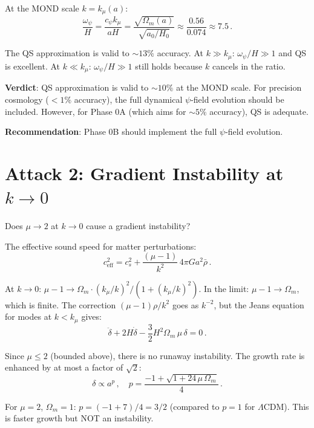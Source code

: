 \documentclass[11pt,a4paper]{article}
\begin{document}
At the MOND scale $k = k_\mu(a)$:
\begin{equation}
\frac{\omega_\psi}{H} = \frac{c_\psi k_\mu}{a H} = \frac{\sqrt{\Omega_m(a)}}{\sqrt{a_0/H_0}} \approx \frac{0.56}{0.074} \approx 7.5\,.
\end{equation}

The QS approximation is valid to $\sim 13\%$ accuracy. At $k \gg k_\mu$: $\omega_\psi/H \gg 1$ and QS is excellent. At $k \ll k_\mu$: $\omega_\psi/H \gg 1$ still holds because $k$ cancels in the ratio.

\textbf{Verdict}: QS approximation is valid to $\sim 10\%$ at the MOND scale. For precision cosmology ($< 1\%$ accuracy), the full dynamical $\psi$-field evolution should be included. However, for Phase 0A (which aims for $\sim 5\%$ accuracy), QS is adequate.

\textbf{Recommendation}: Phase 0B should implement the full $\psi$-field evolution.

\section{Attack 2: Gradient Instability at $k \to 0$}

Does $\mu \to 2$ at $k \to 0$ cause a gradient instability?

The effective sound speed for matter perturbations:
\begin{equation}
c_{\mathrm{eff}}^2 = c_s^2 + \frac{(\mu - 1)}{k^2}\,4\pi G a^2 \bar{\rho}\,.
\end{equation}

At $k \to 0$: $\mu - 1 \to \Omega_m \cdot (k_\mu/k)^2/(1 + (k_\mu/k)^2)$. In the limit: $\mu - 1 \to \Omega_m$, which is finite. The correction $(\mu - 1)\rho/k^2$ goes as $k^{-2}$, but the Jeans equation for modes at $k < k_\mu$ gives:
\begin{equation}
\ddot{\delta} + 2H\dot{\delta} - \frac{3}{2}H^2\Omega_m\,\mu\,\delta = 0\,.
\end{equation}

Since $\mu \leq 2$ (bounded above), there is no runaway instability. The growth rate is enhanced by at most a factor of $\sqrt{2}$:
\begin{equation}
\delta \propto a^{p}\,,\quad p = \frac{-1 + \sqrt{1 + 24\,\mu\,\Omega_m}}{4}\,.
\end{equation}

For $\mu = 2$, $\Omega_m = 1$: $p = (-1 + 7)/4 = 3/2$ (compared to $p = 1$ for $\Lambda$CDM). This is faster growth but NOT an instability.
\end{document}
